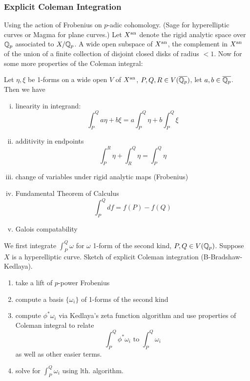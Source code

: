 \subsubsection{Explicit Coleman Integration}

Using the action of Frobenius on $p$-adic cohomology. (Sage for hyperelliptic curves or Magma for plane curves.) Let $X^{\text{an}}$ denote the rigid analytic space over $\mathbb{Q}_p$ associated to $X/\mathbb{Q}_p$. A wide open subspace of $X^{\text{an}}$, the complement in $X^{\text{an}}$ of the union of a finite collection of disjoint closed disks of radius $<1$. Now for some more properties of the Coleman integral:

\begin{thm}[Coleman]
Let $\eta, \xi$ be 1-forms on a wide open $V$ of $X^{\text{an}}$, $P,Q, R \in V(\overline{\mathbb{Q}_p})$, let $a,b \in \overline{\mathbb{Q}_p}$. Then we have 
\begin{enumerate}[(i)]
\item linearity in integrand:
	\[
	\int_P^Q a\eta + b \xi= a \int_P^Q \eta + b \int_P^Q \xi
	\]
\item additivity in endpoints
	\[
	\int_P^R \eta + \int_R^Q \eta= \int_P^Q \eta
	\]
\item change of variables under rigid analytic maps (Frobenius)
\item Fundamental Theorem of Calculus
	\[
	\int_P^Q df= f(P) - f(Q)
	\]
\item Galois compatability
\end{enumerate}
\end{thm}


We first integrate $\int_P^Q \omega$ for $\omega$ 1-form of the second kind, $P, Q \in V(\mathbb{Q}_p)$. Suppose $X$ is a hyperelliptic curve. Sketch of explicit Coleman integration (B-Bradshaw-Kedlaya).


\begin{enumerate}[1.]
\item take a lift of $p$-power Frobenius
\item compute a basis $\{ \omega_i \}$ of 1-forms of the second kind
\item compute $\phi^* \omega_i$ via Kedlaya's zeta function algorithm and use properties of Coleman integral to relate
	\[
	\int_P^Q \phi^*\omega_i \text{ to } \int_P^Q \omega_i
	\]
as well as other easier terms.
\item solve for $\int_P^Q \omega_i$ using lth. algorithm.
\end{enumerate}
 

